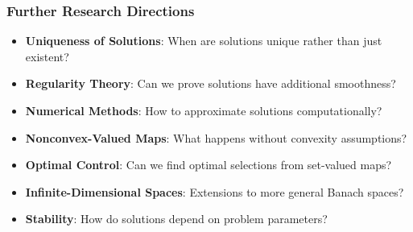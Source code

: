 \documentclass[aspectratio=169,10pt]{beamer}
\begin{document}
\begin{frame}
\frametitle{Further Research Directions}

\begin{itemize}
    \item \textbf{Uniqueness of Solutions}: When are solutions unique rather than just existent?

    \vspace{0.3cm}

    \item \textbf{Regularity Theory}: Can we prove solutions have additional smoothness?

    \vspace{0.3cm}

    \item \textbf{Numerical Methods}: How to approximate solutions computationally?

    \vspace{0.3cm}

    \item \textbf{Nonconvex-Valued Maps}: What happens without convexity assumptions?

    \vspace{0.3cm}

    \item \textbf{Optimal Control}: Can we find optimal selections from set-valued maps?

    \vspace{0.3cm}

    \item \textbf{Infinite-Dimensional Spaces}: Extensions to more general Banach spaces?

    \vspace{0.3cm}

    \item \textbf{Stability}: How do solutions depend on problem parameters?

\end{itemize}

\end{frame}
\end{document}
